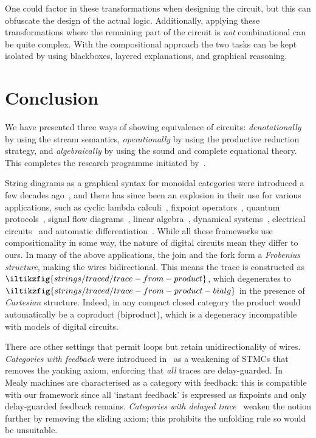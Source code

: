 \documentclass{lmcs}
\begin{document}
One could factor in these transformations when designing the circuit, but this
can obfuscate the design of the actual logic.
Additionally, applying these transformations where the remaining part of the
circuit is \emph{not} combinational can be quite complex.
With the compositional approach the two tasks can be kept isolated by using
blackboxes, layered explanations, and graphical reasoning.

\section{Conclusion}\label{sec:conclusion}

We have presented three ways of showing equivalence of
circuits: \emph{denotationally} by using the stream semantics,
\emph{operationally} by using the productive reduction strategy, and
\emph{algebraically} by using the sound and complete equational theory.
This completes the research programme initiated
by~\cite{ghica2016categorical,ghica2017diagrammatic}.

String diagrams as a graphical syntax for monoidal categories were introduced a
few decades ago~\cite{joyal1991geometry,joyal1996traced}, and there has since
been an explosion in their use for various applications, such as
cyclic lambda calculi~\cite{hasegawa1997recursion,ghica2023string}, fixpoint
operators~\cite{hasegawa2003uniformity},
quantum protocols~\cite{abramsky2004categorical}, signal flow
diagrams~\cite{bonchi2014categorical,bonchi2015full}, linear
algebra~\cite{bonchi2017interacting,zanasi2015interacting,bonchi2019graphical,boisseau2022graphical},
dynamical systems~\cite{baez2015categories,fong2016categorical}, electrical
circuits~\cite{boisseau2022string} and automatic
differentiation~\cite{alvarez-picallo2023functorial}.
While all these frameworks use compositionality in some way, the nature of
digital circuits mean they differ to ours.
%
In many of the above applications, the join and the fork form a
\emph{Frobenius structure}, making the wires bidirectional.
This means the trace is constructed as
\(\iltikzfig{strings/traced/trace-from-product}\),
which degenerates to
\(\iltikzfig{strings/traced/trace-from-product-bialg}\) in the presence of
\emph{Cartesian} structure.
Indeed, in any compact closed category the product would automatically be a
coproduct (biproduct), which is a degeneracy incompatible with models of
digital circuits.

There are other settings that permit loops but retain unidirectionality of
wires.
\emph{Categories with feedback} were introduced in~\cite{katis2002feedback} as a
weakening of STMCs that removes the yanking axiom, enforcing that \emph{all}
traces are delay-guarded.
In~\cite{dilavore2021canonical} Mealy machines are characterised as a category
with feedback: this is compatible with our framework since all `instant
feedback' is expressed as fixpoints and only delay-guarded feedback remains.
\emph{Categories with delayed trace}~\cite{sprunger2019differentiable} weaken
the notion further by removing the sliding axiom; this prohibits the unfolding
rule so would be unsuitable.
\end{document}
